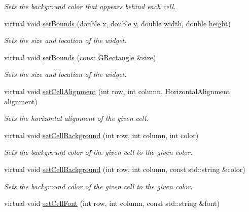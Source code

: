 \begin{DoxyCompactItemize}
\begin{DoxyCompactList}\small\item\em Sets the background color that appears behind each cell. \end{DoxyCompactList}\item 
virtual void \mbox{\hyperlink{classGInteractor_a2aae8197624b72265ab83b4f1bc73f2f}{set\+Bounds}} (double x, double y, double \mbox{\hyperlink{classGTable_ad72663daf610f2a0833a2fc3d78e4fdf}{width}}, double \mbox{\hyperlink{classGTable_ad3774f6419003470f54fd495124ef51f}{height}})
\begin{DoxyCompactList}\small\item\em Sets the size and location of the widget. \end{DoxyCompactList}\item 
virtual void \mbox{\hyperlink{classGInteractor_acada386653f008cacc7cce86426bef7c}{set\+Bounds}} (const \mbox{\hyperlink{structGRectangle}{G\+Rectangle}} \&size)
\begin{DoxyCompactList}\small\item\em Sets the size and location of the widget. \end{DoxyCompactList}\item 
virtual void \mbox{\hyperlink{classGTable_a0c1ff398e920da7356b8375b66b9b083}{set\+Cell\+Alignment}} (int row, int column, Horizontal\+Alignment alignment)
\begin{DoxyCompactList}\small\item\em Sets the horizontal alignment of the given cell. \end{DoxyCompactList}\item 
virtual void \mbox{\hyperlink{classGTable_a50940b22e500a861451bbff938c8f50b}{set\+Cell\+Background}} (int row, int column, int color)
\begin{DoxyCompactList}\small\item\em Sets the background color of the given cell to the given color. \end{DoxyCompactList}\item 
virtual void \mbox{\hyperlink{classGTable_af2d2fa204d2f9260081102a990310cd7}{set\+Cell\+Background}} (int row, int column, const std\+::string \&color)
\begin{DoxyCompactList}\small\item\em Sets the background color of the given cell to the given color. \end{DoxyCompactList}\item 
virtual void \mbox{\hyperlink{classGTable_a8c3d80b0163f465c7306b075d5895313}{set\+Cell\+Font}} (int row, int column, const std\+::string \&font)

\end{DoxyCompactItemize}
